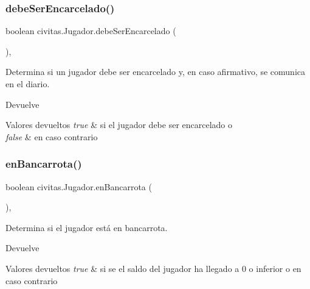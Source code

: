 \subsubsection{\texorpdfstring{debe\+Ser\+Encarcelado()}{debeSerEncarcelado()}}
{\footnotesize\ttfamily boolean civitas.\+Jugador.\+debe\+Ser\+Encarcelado (\begin{DoxyParamCaption}{ }\end{DoxyParamCaption})\hspace{0.3cm}{\ttfamily [inline]}, {\ttfamily [protected]}}

Determina si un jugador debe ser encarcelado y, en caso afirmativo, se comunica en el diario. \begin{DoxyReturn}{Devuelve}

\end{DoxyReturn}

\begin{DoxyRetVals}{Valores devueltos}
{\em true} & si el jugador debe ser encarcelado o \\
\hline
{\em false} & en caso contrario \\
\hline
\end{DoxyRetVals}
\mbox{\label{classcivitas_1_1Jugador_a00dffd4d41a489e824816f7fece988fc}} 
\subsubsection{\texorpdfstring{en\+Bancarrota()}{enBancarrota()}}
{\footnotesize\ttfamily boolean civitas.\+Jugador.\+en\+Bancarrota (\begin{DoxyParamCaption}{ }\end{DoxyParamCaption})\hspace{0.3cm}{\ttfamily [inline]}, {\ttfamily [package]}}

Determina si el jugador está en bancarrota. \begin{DoxyReturn}{Devuelve}

\end{DoxyReturn}

\begin{DoxyRetVals}{Valores devueltos}
{\em true} & si se el saldo del jugador ha llegado a 0 o inferior o  en caso contrario \\
\hline
\end{DoxyRetVals}
\mbox{\label{classcivitas_1_1Jugador_acc3fb8fdf45c820102c69472605abd3f}} 
